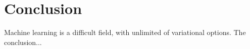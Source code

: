 \section{Conclusion} \label{sec:conclusion}
Machine learning is a difficult field, with unlimited of variational options. The conclusion...